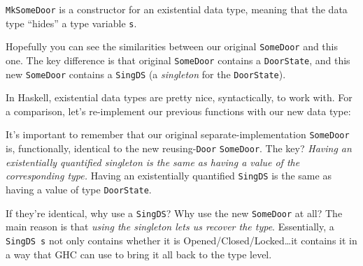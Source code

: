 \documentclass[]{article}
\newenvironment{Shaded}{}{}
\newcommand{\KeywordTok}[1]{\textcolor[rgb]{0.00,0.44,0.13}{\textbf{#1}}}
\newcommand{\DataTypeTok}[1]{\textcolor[rgb]{0.56,0.13,0.00}{#1}}
\newcommand{\CommentTok}[1]{\textcolor[rgb]{0.38,0.63,0.69}{\textit{#1}}}
\newcommand{\OtherTok}[1]{\textcolor[rgb]{0.00,0.44,0.13}{#1}}
\newcommand{\FunctionTok}[1]{\textcolor[rgb]{0.02,0.16,0.49}{#1}}
\newcommand{\NormalTok}[1]{#1}
\begin{document}
\texttt{MkSomeDoor} is a constructor for an existential data type, meaning that
the data type ``hides'' a type variable \texttt{s}.

Hopefully you can see the similarities between our original \texttt{SomeDoor}
and this one. The key difference is that original \texttt{SomeDoor} contains a
\texttt{DoorState}, and this new \texttt{SomeDoor} contains a \texttt{SingDS} (a
\emph{singleton} for the \texttt{DoorState}).

In Haskell, existential data types are pretty nice, syntactically, to work with.
For a comparison, let's re-implement our previous functions with our new data
type:

\begin{Shaded}
\end{Shaded}

It's important to remember that our original separate-implementation
\texttt{SomeDoor} is, functionally, identical to the new reusing-\texttt{Door}
\texttt{SomeDoor}. The key? \emph{Having an existentially quantified singleton
is the same as having a value of the corresponding type.} Having an
existentially quantified \texttt{SingDS} is the same as having a value of type
\texttt{DoorState}.

If they're identical, why use a \texttt{SingDS}? Why use the new
\texttt{SomeDoor} at all? The main reason is that \emph{using the singleton lets
us recover the type}. Essentially, a \texttt{SingDS\ s} not only contains
whether it is Opened/Closed/Locked\ldots{}it contains it in a way that GHC can
use to bring it all back to the type level.
\end{document}
